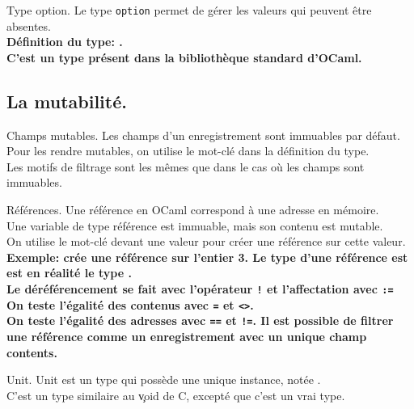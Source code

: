\documentclass[french, 11pt]{article}
\begin{document}
\begin{defi}{Type option.}{}
    Le type \texttt{option} permet de gérer les valeurs qui peuvent être absentes.\\
    \bf{Définition du type:} .\\
    C'est un type présent dans la bibliothèque standard d'OCaml.
\end{defi}

\subsection{La mutabilité.}

\begin{defi}{Champs mutables.}{}
    Les champs d'un enregistrement sont immuables par défaut.\\
    Pour les rendre mutables, on utilise le mot-clé  dans la définition du type.\\
    Les motifs de filtrage sont les mêmes que dans le cas où les champs sont immuables.
\end{defi}

\begin{defi}{Références.}{}
    Une référence en OCaml correspond à une adresse en mémoire.\\
    Une variable de type référence est immuable, mais son contenu est mutable.\\
    On utilise le mot-clé  devant une valeur pour créer une référence sur cette valeur.\n
    \bf{Exemple:}  crée une référence sur l'entier 3.\n
    Le type d'une référence est  est en réalité le type .\\
    Le déréférencement se fait avec l'opérateur \texttt{!} et l'affectation avec \texttt{:=}\n
    On teste l'égalité des contenus avec \texttt{=} et \texttt{<>}.\\
    On teste l'égalité des adresses avec \texttt{==} et \texttt{!=}.\n
    Il est possible de filtrer une référence comme un enregistrement avec un unique champ contents.
\end{defi}

\vspace*{-0.3cm}

\begin{defi}{Unit.}{}
    Unit est un type qui possède une unique instance, notée \ocaml{()}.\\
    C'est un type similaire au \c{void} de C, excepté que c'est un vrai type.
\end{defi}
\end{document}
